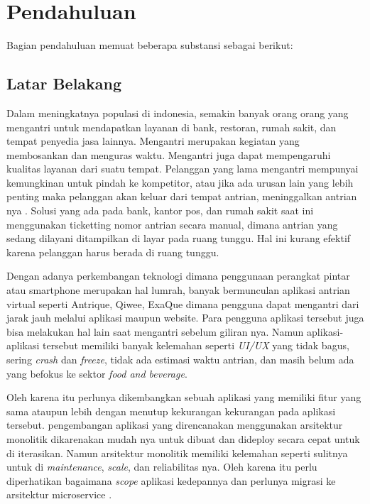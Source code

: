 \chapter{Pendahuluan}
Bagian pendahuluan memuat beberapa substansi sebagai berikut:

\section{Latar Belakang}
Dalam meningkatnya populasi di indonesia, semakin banyak orang orang yang mengantri untuk mendapatkan layanan di bank, restoran, rumah sakit, dan tempat penyedia jasa lainnya. Mengantri merupakan kegiatan yang membosankan dan menguras waktu. Mengantri juga dapat mempengaruhi kualitas layanan dari suatu tempat. Pelanggan yang lama mengantri mempunyai kemungkinan untuk pindah ke kompetitor, atau jika ada urusan lain yang lebih penting maka pelanggan akan keluar dari tempat antrian, meninggalkan antrian nya \cite{khong2017queue}\cite{Ghazal2016}\cite{Uddin2016}. Solusi yang ada pada bank, kantor pos, dan rumah sakit saat ini menggunakan ticketting nomor antrian secara manual, dimana antrian yang sedang dilayani ditampilkan di layar pada ruang tunggu. Hal ini kurang efektif karena pelanggan harus berada di ruang tunggu\cite{Ghazal2016}.

Dengan adanya perkembangan teknologi dimana penggunaan perangkat pintar atau smartphone merupakan hal lumrah, banyak bermunculan aplikasi antrian virtual seperti Antrique, Qiwee, ExaQue dimana pengguna dapat mengantri dari jarak jauh melalui aplikasi maupun website. Para pengguna aplikasi tersebut juga bisa melakukan hal lain saat mengantri sebelum giliran nya. Namun aplikasi-aplikasi tersebut memiliki banyak kelemahan seperti \textit{UI/UX} yang tidak bagus, sering \textit{crash} dan \textit{freeze}, tidak ada estimasi waktu antrian, dan masih belum ada yang befokus ke sektor \textit{food and beverage}.

Oleh karena itu perlunya dikembangkan sebuah aplikasi yang memiliki fitur yang sama ataupun lebih dengan menutup kekurangan kekurangan pada aplikasi tersebut. pengembangan aplikasi yang direncanakan menggunakan arsitektur monolitik dikarenakan mudah nya untuk dibuat dan dideploy secara cepat untuk di iterasikan. Namun arsitektur monolitik memiliki kelemahan seperti sulitnya untuk di \textit{maintenance}, \textit{scale}, dan reliabilitas nya. Oleh karena itu perlu diperhatikan bagaimana \textit{scope} aplikasi kedepannya dan perlunya migrasi ke arsitektur microservice \cite{gos2020comparison} \cite{jatkiewicz2023differences}.

